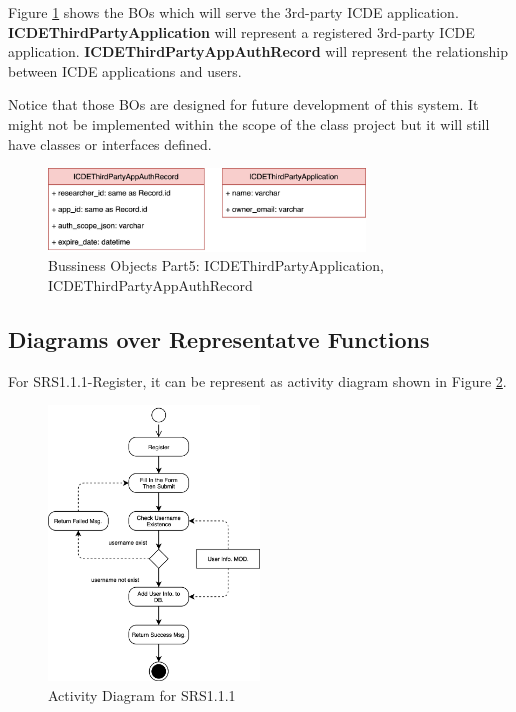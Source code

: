 Figure \ref{fig:bo_classes_6} shows the BOs which will serve the 3rd-party ICDE application.
\textbf{ICDEThirdPartyApplication} will represent a registered 3rd-party ICDE application.
\textbf{ICDEThirdPartyAppAuthRecord} will represent the relationship between ICDE applications and users.

Notice that those BOs are designed for future development of this system. It might not be implemented within the scope of the class project but it will still have classes or interfaces defined.

\begin{figure}[t]
	\centering
	\includegraphics[width=0.75\textwidth]{./img/bo_classes_6.png}
	\caption{Bussiness Objects Part5: ICDEThirdPartyApplication, ICDEThirdPartyAppAuthRecord}

	\label{fig:bo_classes_6}
\end{figure}

\subsection{Diagrams over Representatve Functions}

For SRS1.1.1-Register, it can be represent as activity diagram shown in Figure \ref{fig:srs_diagram_1}.

\begin{figure}[t]
	\centering
	\includegraphics[width=0.5\textwidth]{./img/srs_diagram_1.png}
	\caption{Activity Diagram for SRS1.1.1}

	\label{fig:srs_diagram_1}
\end{figure}

